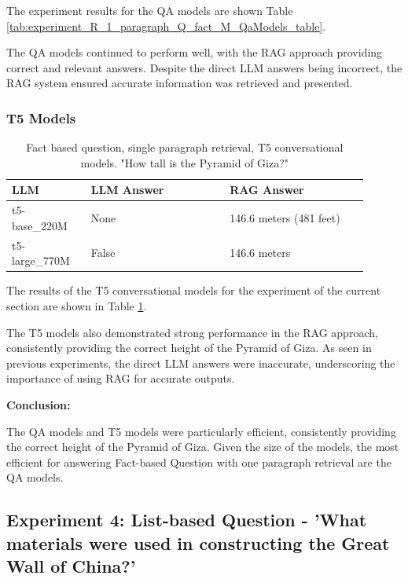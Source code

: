 \documentclass{wseas}
\begin{document}
The experiment results for the QA models are shown Table \ref{tab:experiment_R_1_paragraph_Q_fact_M_QaModels_table}.

The QA models continued to perform well, with the RAG approach providing
correct and relevant answers. Despite the direct LLM answers being
incorrect, the RAG system ensured accurate information was retrieved and
presented.

\subsubsection{T5 Models}


\begin{table}[htbp]
  \caption{Fact based question, single paragraph retrieval, T5 conversational models. "How tall is the Pyramid of Giza?"} %
  \centering
  \label{tab:experiment_R_1_paragraph_Q_fact_M_T5Models_table}
  \begin{tabular}{|p{0.20\linewidth}|p{0.35\linewidth}|p{0.35\linewidth}|}
    \hline
    \textbf{LLM} & \textbf{LLM Answer} & \textbf{RAG Answer} \\ \hline
    t5-base\_220M & None & 146.6 meters (481 feet) \\ \hline
    t5-large\_770M & False & 146.6 meters \\ \hline
  \end{tabular}
\end{table}

The results of the T5 conversational models for the experiment of the current section 
are shown in Table \ref{tab:experiment_R_1_paragraph_Q_fact_M_T5Models_table}.

The T5 models also demonstrated strong performance in the RAG approach,
consistently providing the correct height of the Pyramid of Giza. As
seen in previous experiments, the direct LLM answers were inaccurate,
underscoring the importance of using RAG for accurate outputs.

\textbf{Conclusion:}

The QA models and T5 models were particularly efficient, consistently
providing the correct height of the Pyramid of Giza. Given the size of
the models, the most efficient for answering Fact-based Question with
one paragraph retrieval are the QA models.

\subsection{Experiment 4: List-based Question - 'What materials were
used in constructing the Great Wall of China?'}
\end{document}

